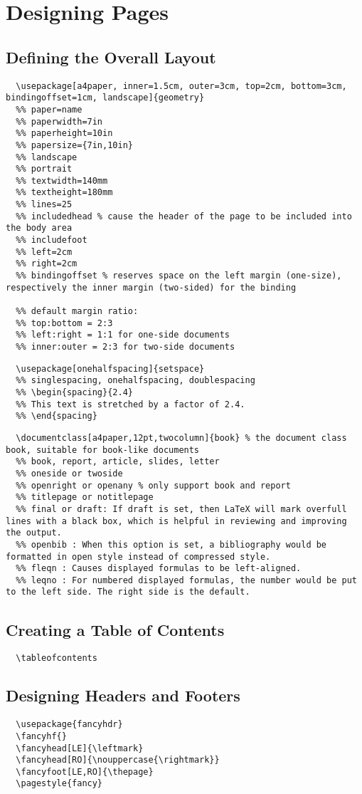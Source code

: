 \chapter{Designing Pages}

\section{Defining the Overall Layout}
\begin{lstlisting}
  \usepackage[a4paper, inner=1.5cm, outer=3cm, top=2cm, bottom=3cm, bindingoffset=1cm, landscape]{geometry}
  %% paper=name
  %% paperwidth=7in
  %% paperheight=10in
  %% papersize={7in,10in}
  %% landscape
  %% portrait
  %% textwidth=140mm
  %% textheight=180mm
  %% lines=25
  %% includedhead % cause the header of the page to be included into the body area
  %% includefoot
  %% left=2cm
  %% right=2cm
  %% bindingoffset % reserves space on the left margin (one-size), respectively the inner margin (two-sided) for the binding

  %% default margin ratio:
  %% top:bottom = 2:3
  %% left:right = 1:1 for one-side documents
  %% inner:outer = 2:3 for two-side documents
\end{lstlisting}

\begin{lstlisting}
  \usepackage[onehalfspacing]{setspace}
  %% singlespacing, onehalfspacing, doublespacing
  %% \begin{spacing}{2.4}
  %% This text is stretched by a factor of 2.4.
  %% \end{spacing}
\end{lstlisting}


\begin{lstlisting}
  \documentclass[a4paper,12pt,twocolumn]{book} % the document class book, suitable for book-like documents
  %% book, report, article, slides, letter
  %% oneside or twoside
  %% openright or openany % only support book and report
  %% titlepage or notitlepage
  %% final or draft: If draft is set, then LaTeX will mark overfull lines with a black box, which is helpful in reviewing and improving the output.
  %% openbib : When this option is set, a bibliography would be formatted in open style instead of compressed style.
  %% fleqn : Causes displayed formulas to be left-aligned.
  %% leqno : For numbered displayed formulas, the number would be put to the left side. The right side is the default.
\end{lstlisting}


\section{Creating a Table of Contents}
\begin{lstlisting}
  \tableofcontents
\end{lstlisting}

\section{Designing Headers and Footers}
\begin{lstlisting}
  \usepackage{fancyhdr}
  \fancyhf{}
  \fancyhead[LE]{\leftmark}
  \fancyhead[RO]{\nouppercase{\rightmark}}
  \fancyfoot[LE,RO]{\thepage}
  \pagestyle{fancy}
\end{lstlisting}
